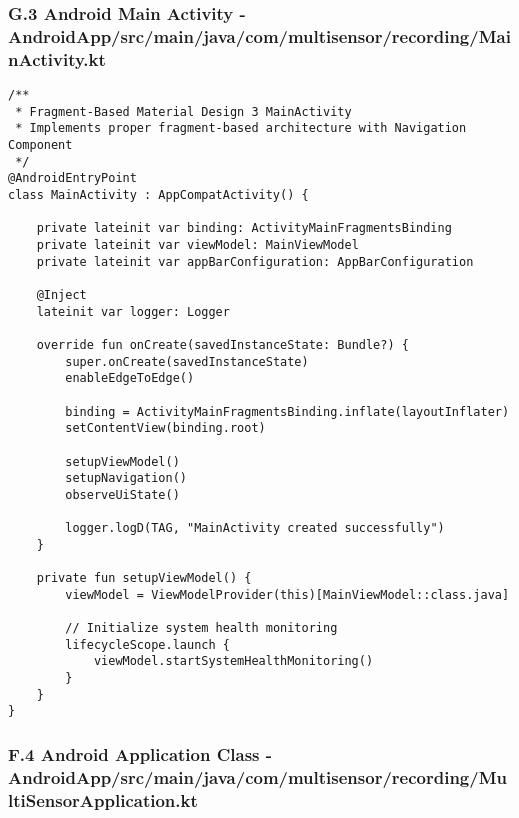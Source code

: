 \documentclass[12pt,a4paper]{article}
\begin{document}
\subsubsection{G.3 Android Main Activity - AndroidApp/src/main/java/com/multisensor/recording/MainActivity.kt}

\begin{verbatim}
/**
 * Fragment-Based Material Design 3 MainActivity
 * Implements proper fragment-based architecture with Navigation Component
 */
@AndroidEntryPoint
class MainActivity : AppCompatActivity() {
    
    private lateinit var binding: ActivityMainFragmentsBinding
    private lateinit var viewModel: MainViewModel
    private lateinit var appBarConfiguration: AppBarConfiguration
    
    @Inject
    lateinit var logger: Logger
    
    override fun onCreate(savedInstanceState: Bundle?) {
        super.onCreate(savedInstanceState)
        enableEdgeToEdge()
        
        binding = ActivityMainFragmentsBinding.inflate(layoutInflater)
        setContentView(binding.root)
        
        setupViewModel()
        setupNavigation()
        observeUiState()
        
        logger.logD(TAG, "MainActivity created successfully")
    }
    
    private fun setupViewModel() {
        viewModel = ViewModelProvider(this)[MainViewModel::class.java]
        
        // Initialize system health monitoring
        lifecycleScope.launch {
            viewModel.startSystemHealthMonitoring()
        }
    }
}
\end{verbatim}

\subsubsection{F.4 Android Application Class - AndroidApp/src/main/java/com/multisensor/recording/MultiSensorApplication.kt}
\end{document}
